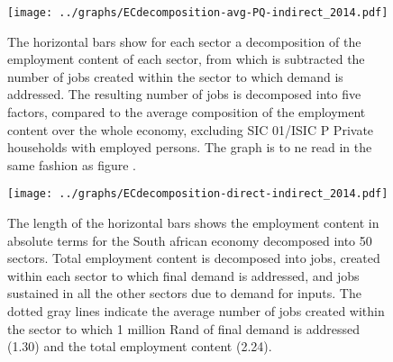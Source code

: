 \documentclass[12pt,english]{article}
\begin{document}
\begin{figure}[!ht]
	\centering
	\texttt{[image: ../graphs/ECdecomposition-avg-PQ-indirect\_2014.pdf]}
	\caption{\footnotesize \label{Decomposition_PQ_other}The horizontal bars show for each sector a decomposition of the employment content of each sector, from which is subtracted the number of jobs created within the sector to which demand is addressed. The resulting number of jobs is decomposed into five factors, compared to the average composition of the employment content over the whole economy, excluding SIC 01/ISIC P Private households with employed persons. The graph is to ne read in the same fashion as figure \label{Decomposition_PQ}. %
	}
\end{figure}

\begin{figure}[!ht]
	\centering
	\thispagestyle{empty}
	\texttt{[image: ../graphs/ECdecomposition-direct-indirect\_2014.pdf]}
	\caption{\label{Decomposition_direct_indirect_absolute} The length of the horizontal bars shows the employment content in absolute terms for the South african economy decomposed into 50 sectors. %
		Total employment content is decomposed into jobs, created within each sector to which final demand is addressed, and jobs sustained in all the other sectors due to demand for inputs. The dotted gray lines indicate the average number of jobs created within the sector to which 1 million Rand of final demand is addressed (1.30) and the total employment content (2.24).}
\end{figure}	
\end{document}
